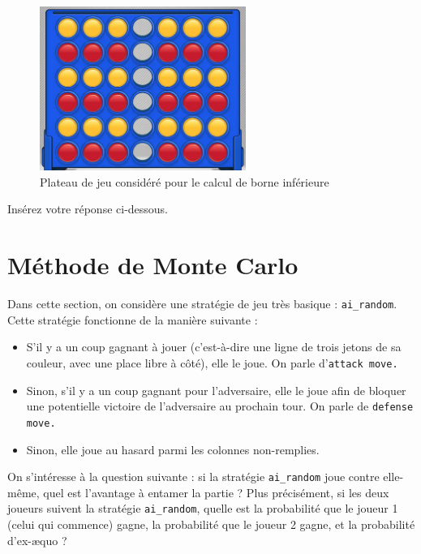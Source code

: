 \documentclass[11pt,answers]{exam}
\begin{document}
\begin{figure}[!h]
	\centering
	\includegraphics[width=0.6\textwidth]{board.png}
 	\caption{Plateau de jeu considéré pour le calcul de borne inférieure}
	\label{fig:bound}
\end{figure}

\begin{solutionbox}{120mm}
Insérez votre réponse ci-dessous.


\end{solutionbox}

\newpage

\section{Méthode de Monte Carlo}

Dans cette section, on considère une stratégie de jeu très basique : \texttt{ai\_random}. Cette stratégie fonctionne de la manière suivante :
\begin{itemize}
    \item S'il y a un coup gagnant à jouer (c'est-à-dire une ligne de trois jetons de sa couleur, avec une place libre à côté), elle le joue. On parle d'\texttt{attack move.}
    \item Sinon, s'il y a un coup gagnant pour l'adversaire, elle le joue afin de bloquer une potentielle victoire de l'adversaire au prochain tour. On parle de \texttt{defense move.}
    \item Sinon, elle joue au hasard parmi les colonnes non-remplies.
\end{itemize}

On s'intéresse à la question suivante : si la stratégie \texttt{ai\_random} joue contre elle-même, quel est l'avantage à entamer la partie ? Plus précisément, si les deux joueurs suivent la stratégie \texttt{ai\_random}, quelle est la probabilité que le joueur 1 (celui qui commence) gagne, la probabilité que le joueur 2 gagne, et la probabilité d'ex-æquo ?\\
\end{document}
